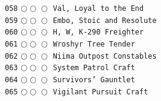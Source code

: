 \documentclass[a4paper,landscape]{article}
\begin{document}
\begin{multicols*}{5}
\texttt{058} \(\bigcirc\!\bigcirc\!\bigcirc\)  \texttt{Val, Loyal to the End} \vspace{-0.3mm}\\ 
\texttt{059} \(\bigcirc\!\bigcirc\!\bigcirc\)  \texttt{Embo, Stoic and Resolute} \vspace{-0.3mm}\\ 
\texttt{060} \(\bigcirc\!\bigcirc\!\bigcirc\)  \texttt{H, W, K-290 Freighter} \vspace{-0.3mm}\\ 
\texttt{061} \(\bigcirc\!\bigcirc\!\bigcirc\)  \texttt{Wroshyr Tree Tender} \vspace{-0.3mm}\\ 
\texttt{062} \(\bigcirc\!\bigcirc\!\bigcirc\)  \texttt{Niima Outpost Constables} \vspace{-0.3mm}\\ 
\texttt{063} \(\bigcirc\!\bigcirc\!\bigcirc\)  \texttt{System Patrol Craft} \vspace{-0.3mm}\\ 
\texttt{064} \(\bigcirc\!\bigcirc\!\bigcirc\)  \texttt{Survivors’ Gauntlet} \vspace{-0.3mm}\\ 
\texttt{065} \(\bigcirc\!\bigcirc\!\bigcirc\)  \texttt{Vigilant Pursuit Craft} \vspace{-0.3mm}\\ 

\end{multicols*}
\end{document}
